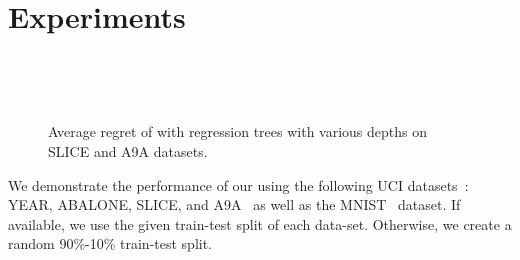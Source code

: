 \section{Experiments}
\begin{figure}[th!]
    \centering
    ~
    
    ~
    \caption{Average regret of \algshort with regression trees with various depths on SLICE and A9A datasets.}
    \label{fig:regret}
\end{figure}

We demonstrate the performance of our \algname using the following UCI datasets~\citep{Lichman:2013}: YEAR, ABALONE, SLICE, and A9A~\citep{adult} as well as the  MNIST~\citep{mnist} dataset. If available, we use the given train-test split of each data-set. Otherwise, we create a random 90\%-10\% train-test split. 

    
    
    
